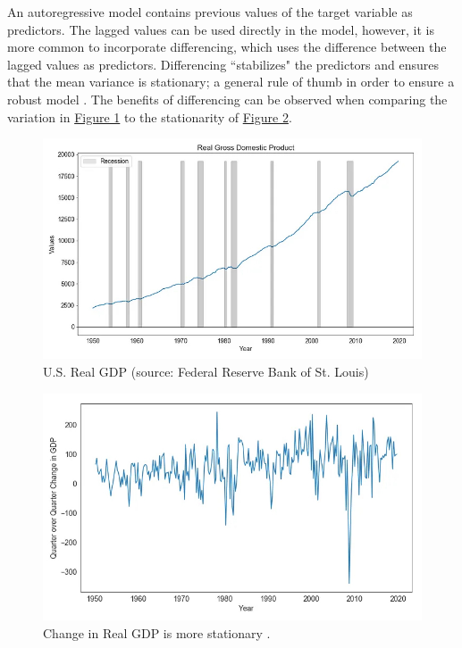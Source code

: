 \documentclass[twoside,11pt]{article}
\begin{document}
An autoregressive model contains previous values of the target variable as predictors. The lagged values can be used directly in the model, however, it is more common to incorporate differencing, which uses the difference between the lagged values as predictors. Differencing ``stabilizes" the predictors and ensures that the mean variance is stationary; a general rule of thumb in order to ensure a robust model \citep{yiu}. The benefits of differencing can be observed when comparing the variation in \hyperref[fig:gdp1]{Figure 1} to the stationarity of \hyperref[fig:gdp2]{Figure 2}.
\begin{figure}[H]
    \centering
    \includegraphics[scale=0.3]{img/gdp-eg1.jpeg}
    \caption{U.S. Real GDP (source: Federal Reserve Bank of St. Louis) \citep{yiu}}
    \label{fig:gdp1}
\end{figure}
\begin{figure}[H]
    \centering
    \includegraphics[scale=0.3]{img/gdp-eg2.jpeg}
    \caption{Change in Real GDP is more stationary \citep{yiu}.}
    \label{fig:gdp2}
\end{figure}
\end{document}
